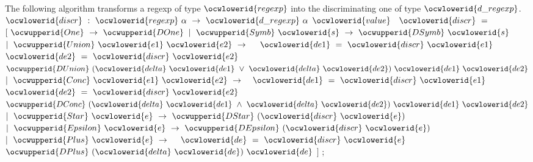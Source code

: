 \documentclass[12pt]{article}
\begin{document}
\ocwendcode{}\ocwindent{0.00em}
The following algorithm transforms a regexp of type \ocwbegindcode{}$\ocwlowerid{regexp}$\ocwenddcode{} 
   into the discriminating one of type \ocwbegindcode{}$\ocwlowerid{d\_regexp}$\ocwenddcode{}. 
\ocweol
\ocwindent{0.00em}
\ocwbegindcode{}$\ocwlowerid{discr}~:~\ocwlowerid{regexp}~\alpha{}~\rightarrow{}~\ocwlowerid{d\_regexp}~\alpha{}$\ocwenddcode{} 
\ocweol
\label{../ML/regular.ml:7840}%
\medskip
\ocwbegincode{}\ocwindent{0.00em}
$\ocwlowerid{value}~$~$\ocwlowerid{discr}~=~$\ocweol
\ocwindent{1.00em}
$[~\ocwupperid{One}~\rightarrow{}~\ocwupperid{DOne}$\ocweol
\ocwindent{1.00em}
$\mid{}~\ocwupperid{Symb}~\ocwlowerid{s}~\rightarrow{}~\ocwupperid{DSymb}~\ocwlowerid{s}$\ocweol
\ocwindent{1.00em}
$\mid{}~\ocwupperid{Union}~\ocwlowerid{e1}~\ocwlowerid{e2}~\rightarrow{}~$\ocweol
\ocwindent{3.00em}
~$\ocwlowerid{de1}~=~\ocwlowerid{discr}~\ocwlowerid{e1}~$\ocweol
\ocwindent{3.00em}
~$\ocwlowerid{de2}~=~\ocwlowerid{discr}~\ocwlowerid{e2}~$\ocweol
\ocwindent{3.00em}
$\ocwupperid{DUnion}~(\ocwlowerid{delta}~\ocwlowerid{de1}~\lor{}~\ocwlowerid{delta}~\ocwlowerid{de2})~\ocwlowerid{de1}~\ocwlowerid{de2}$\ocweol
\ocwindent{1.00em}
$\mid{}~\ocwupperid{Conc}~\ocwlowerid{e1}~\ocwlowerid{e2}~\rightarrow{}$\ocweol
\ocwindent{3.00em}
~$\ocwlowerid{de1}~=~\ocwlowerid{discr}~\ocwlowerid{e1}~$\ocweol
\ocwindent{3.00em}
~$\ocwlowerid{de2}~=~\ocwlowerid{discr}~\ocwlowerid{e2}~$\ocweol
\ocwindent{3.00em}
$\ocwupperid{DConc}~(\ocwlowerid{delta}~\ocwlowerid{de1}~\land{}~\ocwlowerid{delta}~\ocwlowerid{de2})~\ocwlowerid{de1}~\ocwlowerid{de2}$\ocweol
\ocwindent{1.00em}
$\mid{}~\ocwupperid{Star}~\ocwlowerid{e}~\rightarrow{}~\ocwupperid{DStar}~(\ocwlowerid{discr}~\ocwlowerid{e})$\ocweol
\ocwindent{1.00em}
$\mid{}~\ocwupperid{Epsilon}~\ocwlowerid{e}~\rightarrow{}~\ocwupperid{DEpsilon}~(\ocwlowerid{discr}~\ocwlowerid{e})$\ocweol
\ocwindent{1.00em}
$\mid{}~\ocwupperid{Plus}~\ocwlowerid{e}~\rightarrow{}~$\ocweol
\ocwindent{3.00em}
~$\ocwlowerid{de}~=~\ocwlowerid{discr}~\ocwlowerid{e}~$\ocweol
\ocwindent{3.00em}
$\ocwupperid{DPlus}~(\ocwlowerid{delta}~\ocwlowerid{de})~\ocwlowerid{de}$\ocweol
\ocwindent{1.00em}
$]$\ocweol
\ocwindent{0.00em}
;\medskip
\end{document}
